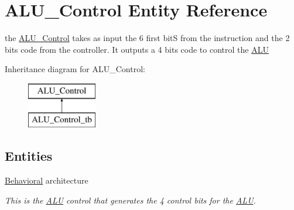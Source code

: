\hypertarget{class_a_l_u___control}{\section{A\-L\-U\-\_\-\-Control Entity Reference}
\label{class_a_l_u___control}
}


the \hyperlink{class_a_l_u___control}{A\-L\-U\-\_\-\-Control} takes as input the 6 first bit\-S from the instruction and the 2 bits code from the controller. It outputs a 4 bits code to control the \hyperlink{class_a_l_u}{A\-L\-U}  


Inheritance diagram for A\-L\-U\-\_\-\-Control\-:\begin{figure}[H]
\begin{center}
\leavevmode
\includegraphics[height=2.000000cm]{class_a_l_u___control}
\end{center}
\end{figure}
\subsection*{Entities}
\begin{DoxyCompactItemize}
\item 
\hyperlink{class_a_l_u___control_1_1_behavioral}{Behavioral} architecture
\begin{DoxyCompactList}\small\item\em This is the \hyperlink{class_a_l_u}{A\-L\-U} control that generates the 4 control bits for the \hyperlink{class_a_l_u}{A\-L\-U}. \end{DoxyCompactList}\end{DoxyCompactItemize}
